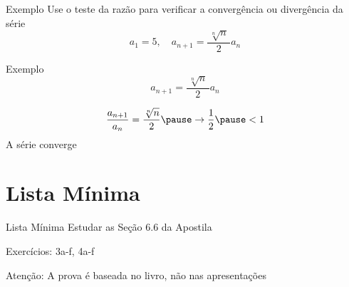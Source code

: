 \documentclass[fleqn,utf8,aspectratio=169,12pt]{beamer}
\begin{document}
\addtocounter{exemplo}{1}
\begin{frame}{Exemplo \theexemplo}
  Use o teste da razão para verificar a convergência ou divergência da série
  \[
    a_1 = 5,
    \quad
    a_{n+1} = \frac{\,\sqrt[n]{n}\,}{2} a_n
  \]
\end{frame}

\begin{frame}{Exemplo \theexemplo}
  \[
    a_{n+1} = \frac{\,\sqrt[n]{n}\,}{2} a_n
  \]

  \pause
  \[
    \frac{a_{n+1}}{a_n}
    = \frac{\sqrt[n]{n}}{2}
    \pause
    \to \frac{1}{2}
    \pause
    < 1
  \]
  A série converge
\end{frame}

\section{Lista Mínima}

\begin{frame}{Lista Mínima}
  Estudar as Seção 6.6 da Apostila

  \vspace{\baselineskip}
  Exercícios: 3a-f, 4a-f

  \vfill
  Atenção: A prova é baseada no livro, não nas apresentações
\end{frame}

\end{document}
